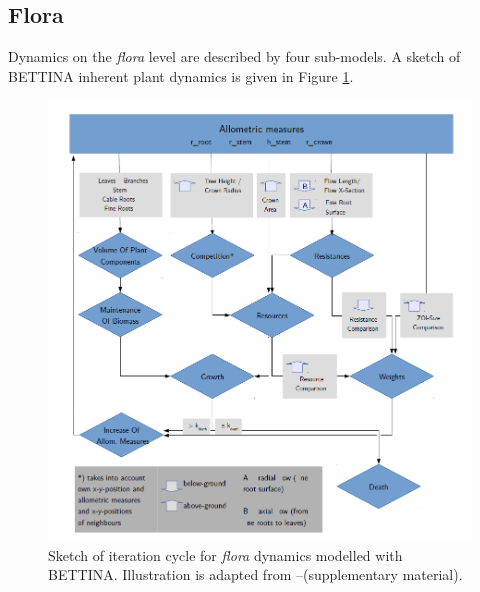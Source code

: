 \documentclass[manusscript, 12p, authoryear]{elsarticle}
\begin{document}
\subsection{Flora}
Dynamics on the \textit{flora} level are described by four sub-models.
A sketch of BETTINA inherent plant dynamics is given in Figure \ref{fig_bettina_sketch}.
\begin{figure}[h]\centering
\includegraphics[width=.8\textwidth]{bettina_sketch.png} 
\caption{Sketch of iteration cycle for \textit{flora} dynamics modelled with BETTINA. Illustration is adapted from \citet{Ronny2014}--(supplementary material).}\label{fig_bettina_sketch}
\end{figure} 
\end{document}
